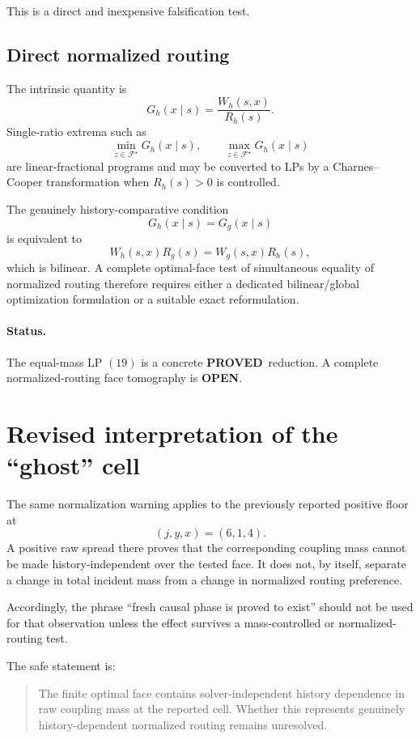 \documentclass[11pt,a4paper]{article}
\newcommand{\F}{\mathcal F}
\newcommand{\PROVED}{\textcolor{green!45!black}{\textbf{PROVED}}}
\newcommand{\OPEN}{\textcolor{red!70!black}{\textbf{OPEN}}}
\begin{document}
This is a direct and inexpensive falsification test.

\subsection{Direct normalized routing}

The intrinsic quantity is
\[
G_h(x\mid s)=\frac{W_h(s,x)}{R_h(s)}.
\]
Single-ratio extrema such as
\[
\min_{z\in\F^\star} G_h(x\mid s),
\qquad
\max_{z\in\F^\star} G_h(x\mid s)
\]
are linear-fractional programs and may be converted to LPs by a
Charnes--Cooper transformation when \(R_h(s)>0\) is controlled.

The genuinely history-comparative condition
\[
G_h(x\mid s)=G_g(x\mid s)
\]
is equivalent to
\[
W_h(s,x)R_g(s)=W_g(s,x)R_h(s),
\]
which is bilinear.  A complete optimal-face test of simultaneous equality of
normalized routing therefore requires either a dedicated bilinear/global
optimization formulation or a suitable exact reformulation.

\paragraph{Status.}
The equal-mass LP \((19)\) is a concrete \PROVED\ reduction.
A complete normalized-routing face tomography is \OPEN.

\section{Revised interpretation of the ``ghost'' cell}

The same normalization warning applies to the previously reported positive
floor at
\[
(j,y,x)=(6,1,4).
\]
A positive raw spread there proves that the corresponding coupling mass cannot
be made history-independent over the tested face.  It does not, by itself,
separate a change in total incident mass from a change in normalized routing
preference.

Accordingly, the phrase ``fresh causal phase is proved to exist'' should not
be used for that observation unless the effect survives a mass-controlled or
normalized-routing test.

The safe statement is:

\begin{quote}
The finite optimal face contains solver-independent history dependence in raw
coupling mass at the reported cell.  Whether this represents genuinely
history-dependent normalized routing remains unresolved.
\end{quote}
\end{document}
